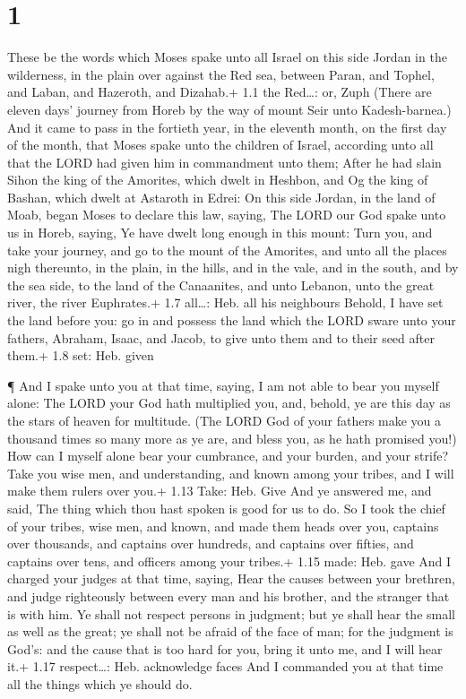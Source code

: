\hypertarget{section}{%
\section{1}\label{section}}

 These be the words which Moses spake unto all Israel on
this side Jordan in the wilderness, in the plain over against the Red
sea, between Paran, and Tophel, and Laban, and Hazeroth, and Dizahab.+
1.1 the Red\ldots: or, Zuph  (There are eleven days' journey
from Horeb by the way of mount Seir unto Kadesh-barnea.) 
And it came to pass in the fortieth year, in the eleventh month, on the
first day of the month, that Moses spake unto the children of Israel,
according unto all that the LORD had given him in commandment unto them;
 After he had slain Sihon the king of the Amorites, which
dwelt in Heshbon, and Og the king of Bashan, which dwelt at Astaroth in
Edrei:  On this side Jordan, in the land of Moab, began
Moses to declare this law, saying,  The LORD our God spake
unto us in Horeb, saying, Ye have dwelt long enough in this mount:
 Turn you, and take your journey, and go to the mount of the
Amorites, and unto all the places nigh thereunto, in the plain, in the
hills, and in the vale, and in the south, and by the sea side, to the
land of the Canaanites, and unto Lebanon, unto the great river, the
river Euphrates.+ 1.7 all\ldots: Heb. all his neighbours 
Behold, I have set the land before you: go in and possess the land which
the LORD sware unto your fathers, Abraham, Isaac, and Jacob, to give
unto them and to their seed after them.+ 1.8 set: Heb. given

 ¶ And I spake unto you at that time, saying, I am not able
to bear you myself alone:  The LORD your God hath
multiplied you, and, behold, ye are this day as the stars of heaven for
multitude.  (The LORD God of your fathers make you a
thousand times so many more as ye are, and bless you, as he hath
promised you!)  How can I myself alone bear your cumbrance,
and your burden, and your strife?  Take you wise men, and
understanding, and known among your tribes, and I will make them rulers
over you.+ 1.13 Take: Heb. Give  And ye answered me, and
said, The thing which thou hast spoken is good for us to do.
 So I took the chief of your tribes, wise men, and known,
and made them heads over you, captains over thousands, and captains over
hundreds, and captains over fifties, and captains over tens, and
officers among your tribes.+ 1.15 made: Heb. gave  And I
charged your judges at that time, saying, Hear the causes between your
brethren, and judge righteously between every man and his brother, and
the stranger that is with him.  Ye shall not respect
persons in judgment; but ye shall hear the small as well as the great;
ye shall not be afraid of the face of man; for the judgment is God's:
and the cause that is too hard for you, bring it unto me, and I will
hear it.+ 1.17 respect\ldots: Heb. acknowledge faces  And I
commanded you at that time all the things which ye should do.

